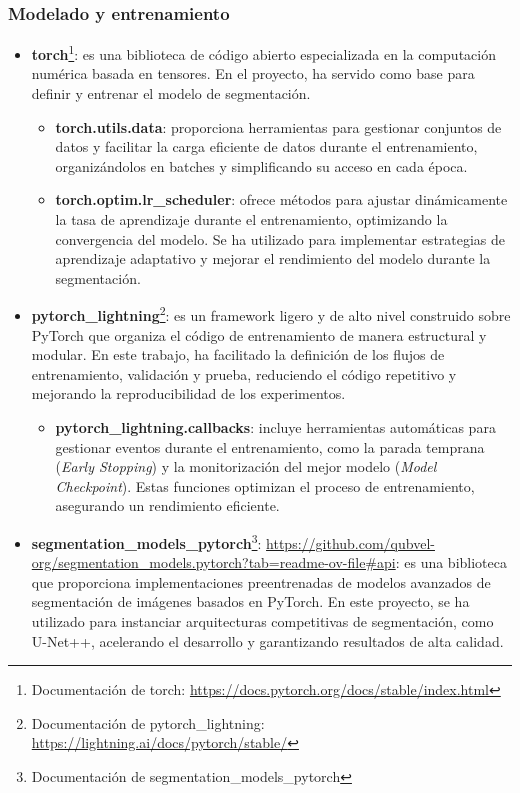 \subsubsection{Modelado y entrenamiento}
\begin{itemize}
    \item \textbf{torch}\footnote{Documentación de torch: \url{https://docs.pytorch.org/docs/stable/index.html}}: es una biblioteca de código abierto especializada en la computación numérica basada en tensores. En el proyecto, ha servido como base para definir y entrenar el modelo de segmentación.
    \begin{itemize}
    \item \textbf{torch.utils.data}: proporciona herramientas para gestionar conjuntos de datos y facilitar la carga eficiente de datos durante el entrenamiento, organizándolos en batches y simplificando su acceso en cada época.
    \item \textbf{torch.optim.lr\_scheduler}: ofrece métodos para ajustar dinámicamente la tasa de aprendizaje durante el entrenamiento, optimizando la convergencia del modelo. Se ha utilizado para implementar estrategias de aprendizaje adaptativo y mejorar el rendimiento del modelo durante la segmentación.
    \end{itemize}
    \item \textbf{pytorch\_lightning}\footnote{Documentación de pytorch\_lightning: \url{https://lightning.ai/docs/pytorch/stable/}}: es un framework ligero y de alto nivel construido sobre PyTorch que organiza el código de entrenamiento de manera estructural y modular. En este trabajo, ha facilitado la definición de los flujos de entrenamiento, validación y prueba, reduciendo el código repetitivo y mejorando la reproducibilidad de los experimentos.
    \begin{itemize}
    \item \textbf{pytorch\_lightning.callbacks}: incluye herramientas automáticas para gestionar eventos durante el entrenamiento, como la parada temprana (\textit{Early Stopping}) y la monitorización del mejor modelo (\textit{Model Checkpoint}). Estas funciones optimizan el proceso de entrenamiento, asegurando un rendimiento eficiente.
    \end{itemize}
    \item \textbf{segmentation\_models\_pytorch}\footnote{Documentación de segmentation\_models\_pytorch}: \url{https://github.com/qubvel-org/segmentation_models.pytorch?tab=readme-ov-file#api}: es una biblioteca que proporciona implementaciones preentrenadas de modelos avanzados de segmentación de imágenes basados en PyTorch. En este proyecto, se ha utilizado para instanciar arquitecturas competitivas de segmentación, como U-Net++, acelerando el desarrollo y garantizando resultados de alta calidad.
\end{itemize}
